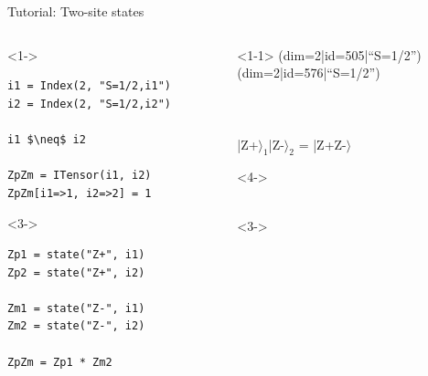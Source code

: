 \begin{frame}[fragile]{Tutorial: Two-site states}

\begin{columns}

\begin{column}{4.5cm}

\begin{onlyenv}<1->
\begin{lstlisting}[language=JuliaLocal, style=julia, mathescape, basicstyle=\scriptsize\ttfamily]
i1 = Index(2, "S=1/2,i1")
i2 = Index(2, "S=1/2,i2")

i1 $\neq$ i2

ZpZm = ITensor(i1, i2)
ZpZm[i1=>1, i2=>2] = 1
\end{lstlisting}
\end{onlyenv}

\begin{onlyenv}<3->
\begin{lstlisting}[language=JuliaLocal, style=julia, basicstyle=\scriptsize\ttfamily]
Zp1 = state("Z+", i1)
Zp2 = state("Z+", i2)

Zm1 = state("Z-", i1)
Zm2 = state("Z-", i2)

ZpZm = Zp1 * Zm2
\end{lstlisting}
\end{onlyenv}

\end{column}

\begin{column}{5cm}

\begin{onlyenv}<1-1>
(dim=2|id=505|``S=1/2'') \\
(dim=2|id=576|``S=1/2'') \\
~\\
~\\
~\\
|Z+$\rangle_1$|Z-$\rangle_2$ = |Z+Z-$\rangle$ \\
\end{onlyenv}

\begin{onlyenv}<4->
~\\
~\\
\end{onlyenv}

\begin{onlyenv}<3->
~\\
\end{onlyenv}


\end{column}
\end{columns}
\end{frame}
